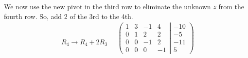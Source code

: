 \documentclass[usenames,dvipsnames,aspectratio=169,10pt]{beamer}
\numberwithin{equation}{section}
\begin{document}
\begin{frame}
We now use the new pivot in the third row to eliminate the unknown $z$ from the fourth
row. So, add 2 of the 3rd to the 4th.
\begin{align*}
\begin{array}{l}
   \\
   \\
   \\
 R_4 \to R_4 + 2R_3
\end{array}
\quad
\left(
	\begin{matrix}
	   1 &   3 & -1 &   4 \\
	   0 &   1 &  2 &   2 \\
	   0 &   0 & -1 &   2 \\
	   0 &   0 &  0 &  -1
	\end{matrix}
  \left|
	\begin{matrix}
	 -10 \\
	  -5 \\
	 -11 \\
	   5
	\end{matrix}
  \right.
\right)
\end{align*}

\end{frame}
\end{document}
